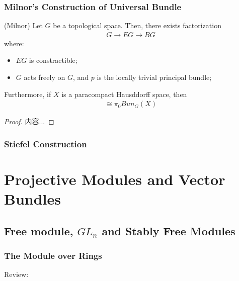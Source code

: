 \documentclass[Total.tex]{subfiles}
\begin{document}
			
			\subsection{Milnor's Construction of Universal Bundle}
				\begin{theorem}
					(Milnor) Let $G$ be a topological space. Then, there exists factorization
					\begin{gather*}
						G\rightarrow EG\rightarrow BG
					\end{gather*}
					where:
					\begin{itemize}
						\item $EG$ is constractible;
						\item $G$ acts freely on $G$, and $p$ is the locally trivial principal bundle;
					\end{itemize}
					
					Furthermore, if $X$ is a paracompact Hausddorff space, then
					\begin{gather*}
						[X,BG]\cong \pi_0 Bun_G(X)
					\end{gather*}
				\end{theorem}
				\begin{proof}
					内容...
				\end{proof}
				
			\subsection{Stiefel Construction}
	\chapter{Projective Modules and Vector Bundles}
	\section{Free module, $GL_n$ and Stably Free Modules}
	
	\subsection{The Module over Rings}
	
	Review:
	
\end{document}
